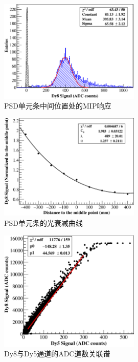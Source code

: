 \begin{figure}[!htbp]
	\centering
	\includegraphics[width=0.6\textwidth]{chap/dynamic_range/fig/mip.eps}
	\caption{PSD单元条中间位置处的MIP响应}
	\label{fig:dynamic_range:mip}
\end{figure}

\begin{figure}[!htbp]
	\centering
	\includegraphics[width=0.6\textwidth]{chap/dynamic_range/fig/atten_right.eps}
	\caption{PSD单元条的光衰减曲线}
	\label{fig:dynamic_range:attenuation}
\end{figure}

\begin{figure}[!htbp]
	\centering
	\includegraphics[width=0.6\textwidth]{chap/dynamic_range/fig/dy58.eps}
	\caption{Dy8与Dy5通道的ADC道数关联谱}
	\label{fig:dynamic_range:dy58}
\end{figure}

